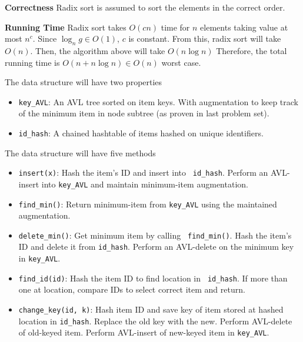 \documentclass[12pt,twoside]{article}
\begin{document}
\begin{problems}
\begin{problemparts}
    {\bf Correctness} Radix sort is assumed to sort the elements in the
    correct order.

    {\bf Running Time} Radix sort takes $O(c n)$ time for $n$ elements taking
    value at most $ n^c $. Since $ \log_n g \in O(1) $, $c$ is constant. From
    this, radix sort will take $O(n)$. Then, the algorithm above will take
    $O(n \log n)$ Therefore, the total running time is $O(n + n \log n) \in
    O(n)$ worst case.
\end{problemparts}

\newpage

 The data structure will have two properties
    \begin{itemize}
        \item {\tt key\_AVL}: An AVL tree sorted on item keys. With
        augmentation to keep track of the minimum item in node subtree (as
        proven in last problem set).
        \item {\tt id\_hash}: A chained hashtable of items hashed on unique
        identifiers.
    \end{itemize}

    The data structure will have five methods
    \begin{itemize}
        \item {\tt insert(x)}: Hash the item's ID and insert into {\tt
        id\_hash}. Perform an AVL-insert into {\tt key\_AVL} and maintain
        minimum-item augmentation.
        \item {\tt find\_min()}: Return minimum-item from {\tt key\_AVL}
        using the maintained augmentation.
        \item {\tt delete\_min()}: Get minimum item by calling {\tt
        find\_min()}. Hash the item's ID and delete it from {\tt id\_hash}.
        Perform an AVL-delete on the minimum key in {\tt key\_AVL}.
        \item {\tt find\_id(id)}: Hash the item ID to find location in {\tt
        id\_hash}. If more than one at location, compare IDs to select
        correct item and return.
        \item {\tt change\_key(id, k)}: Hash item ID and save key of item
        stored at hashed location in {\tt id\_hash}. Replace the old key with
        the new. Perform AVL-delete of old-keyed item. Perform AVL-insert of
        new-keyed item in {\tt key\_AVL}.
    \end{itemize}


\end{problems}
\end{document}
